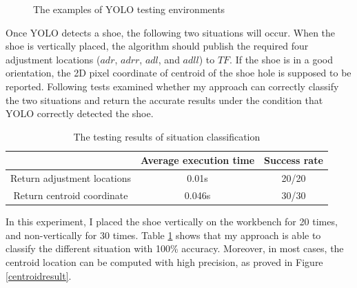 \begin{figure}[H]
\centering
{}
\caption{The examples of YOLO testing environments}
\end{figure}

Once YOLO detects a shoe, the following two situations will occur. When the shoe is vertically placed, the algorithm should publish the required four adjustment locations ($adr$, $adrr$, $adl$, and $adll$) to $TF$. If the shoe is in a good orientation, the 2D pixel coordinate of centroid of the shoe hole is supposed to be reported. Following tests examined whether my approach can correctly classify the two situations and return the accurate results under the condition that YOLO correctly detected the shoe.

\begin{table}[H]
\centering
\begin{tabular}{||c||c|c||}
\hline
 & Average execution time & Success rate \\ \hline \hline
Return adjustment locations & 0.01s & 20/20 \\ \hline
Return centroid coordinate & 0.046s & 30/30 \\ \hline
\end{tabular}
\caption{The testing results of situation classification}
\label{locationtest}
\end{table}

In this experiment, I placed the shoe vertically on the workbench for 20 times, and non-vertically for 30 times. Table \ref{locationtest} shows that my approach is able to classify the different situation with 100\% accuracy. Moreover, in most cases, the centroid location can be computed with high precision, as proved in Figure \ref{centroidresult}. 

